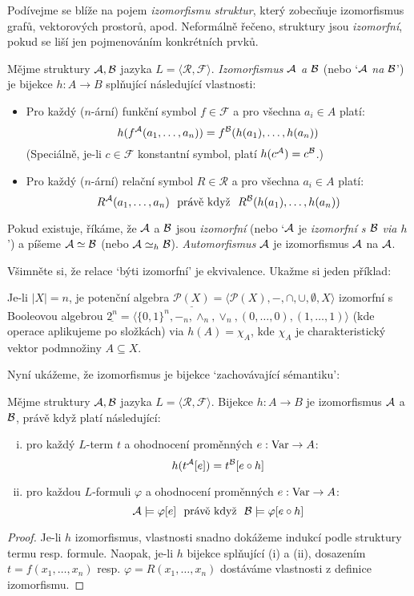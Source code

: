 Podívejme se blíže na pojem \emph{izomorfismu struktur}, který zobecňuje izomorfismus grafů, vektorových prostorů, apod. Neformálně řečeno, struktury jsou \emph{izomorfní}, pokud se liší jen pojmenováním konkrétních prvků.

\begin{definition}
Mějme struktury $\mathcal{A},\mathcal{B}$ jazyka $L=\langle\mathcal R,\mathcal F\rangle$. \emph{Izomorfismus $\mathcal{A}$ a $\mathcal{B}$} (nebo `$\mathcal{A}$ \emph{na} $\mathcal{B}$') je bijekce $h\colon A\to B$ splňující následující vlastnosti:
\begin{itemize}
    \item Pro každý ($n$-ární) funkční symbol $f\in\mathcal F$ a pro všechna $a_i\in A$ platí:
    $$
    h(f^{\mathcal{A}}(a_1,\dots,a_n))=f^{\mathcal{B}}(h(a_1),\dots,h(a_n))
    $$
    (Speciálně, je-li $c\in\mathcal F$ konstantní symbol, platí $h(c^{\mathcal{A}})=c^{\mathcal{B}}$.)
    \item Pro každý ($n$-ární) relační symbol $R\in\mathcal R$ a pro všechna $a_i\in A$ platí:
    $$
    R^{\mathcal{A}}(a_1,\dots,a_n)\ \text{ právě když }\ R^{\mathcal{B}}(h(a_1),\dots,h(a_n))
    $$
\end{itemize}
Pokud existuje, říkáme, že $\mathcal{A}$ a $\mathcal{B}$ jsou \emph{izomorfní} (nebo `$\mathcal{A}$ je \emph{izomorfní s $\mathcal{B}$ via $h$}') a píšeme $\mathcal{A}\simeq\mathcal{B}$ (nebo $\mathcal{A}\simeq_h\mathcal{B}$). \emph{Automorfismus} $\mathcal{A}$ je izomorfismus $\mathcal{A}$ na $\mathcal{A}$.
\end{definition}

Všimněte si, že relace `býti izomorfní' je ekvivalence. Ukažme si jeden příklad:

\begin{example}
    Je-li $|X|=n$, je potenční algebra $\underline{\mathcal P(X)}=\langle \mathcal P(X),-,\cap,\cup,\emptyset,X\rangle$ izomorfní s Booleovou algebrou  $\underline{2^n}=\langle \{0,1\}^n,-_n,\land_n,\lor_n,(0,\dots,0),(1,\dots,1)\rangle$ (kde operace aplikujeme po složkách) via $h(A)=\chi_A$, kde $\chi_A$ je charakteristický vektor podmnožiny $A\subseteq X$.
\end{example}

Nyní ukážeme, že izomorfismus je bijekce `zachovávající sémantiku':

\begin{proposition}
Mějme struktury $\mathcal{A},\mathcal{B}$ jazyka $L=\langle\mathcal R,\mathcal F\rangle$. Bijekce $h\colon A\to B$ je izomorfismus $\mathcal{A}$ a $\mathcal{B}$, právě když platí následující:
\begin{enumerate}[(i)]
    \item pro každý $L$-term $t$ a ohodnocení proměnných $e:\operatorname{Var}\to A$:
    $$
    h(t^{\mathcal{A}}[e])=t^{\mathcal{B}}[e\circ h]
    $$
    \item pro každou $L$-formuli $\varphi$ a ohodnocení proměnných $e:\operatorname{Var}\to A$:
    $$
    \A\models \varphi[e]\ \text{ právě když }\ \B\models\varphi[e\circ h]
    $$
\end{enumerate}
\end{proposition}
\begin{proof}
    Je-li $h$ izomorfismus, vlastnosti snadno dokážeme indukcí podle struktury termu resp. formule. Naopak, je-li $h$ bijekce splňující (i) a (ii), dosazením $t=f(x_1,\dots,x_n)$ resp. $\varphi=R(x_1,\dots,x_n)$ dostáváme vlastnosti z definice izomorfismu.
\end{proof}

